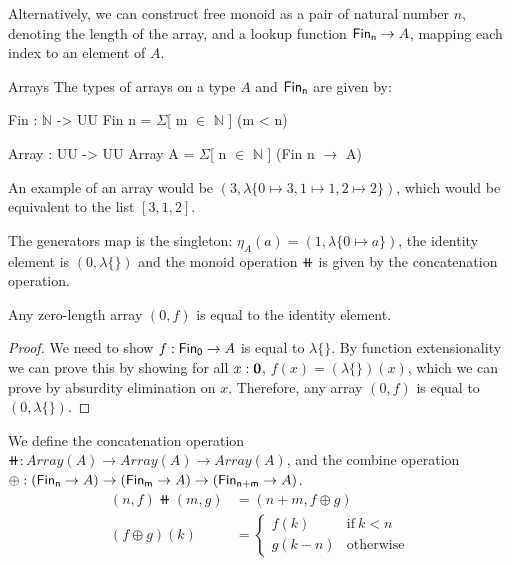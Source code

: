 Alternatively, we can construct free monoid as a pair of natural number $n$, denoting the length of the array,
and a lookup function $\Fin[n] \to A$, mapping each index to an element of $A$.

\begin{definition}{Arrays}
The types of arrays on a type $A$ and $\Fin[n]$ are given by:
\vspace{1em}
\begin{code}
Fin : $\mathbb{N}$ -> UU
Fin n = $\Sigma$[ m $\in$ $\mathbb{N}$ ] (m < n)

Array : UU -> UU
Array A = $\Sigma$[ n $\in$ $\mathbb{N}$ ] (Fin n $\to$ A)
\end{code}
\vspace{1em}
\end{definition}

An example of an array would be $(3, \lambda\{ 0 \mapsto 3, 1 \mapsto 1, 2 \mapsto 2 \})$, which would
be equivalent to the list $[3, 1, 2]$.

The generators map is the singleton: $\eta_A(a) = (1, \lambda\{ 0 \mapsto a \})$, 
the identity element is $(0, \lambda\{\})$
and the monoid operation $\doubleplus$ is given by the concatenation operation.

\begin{lemma}\label{array:zero-is-id}
Any zero-length array $(0, f)$ is equal to the identity element.
\end{lemma}

\begin{proof}
We need to show $f : \Fin[0] \to A$ is equal to $\lambda\{\}$. By function extensionality we can prove
this by showing for all $x : {\mathbf{0}}$, $f(x) = (\lambda\{\})(x)$, which we can prove by absurdity elimination on $x$.
Therefore, any array $(0, f)$ is equal to $(0, \lambda\{\})$.
\end{proof}

\begin{definition}[Concatenation]
We define the concatenation operation $\doubleplus : Array(A) \to Array(A) \to Array(A)$,
and the combine operation $\oplus : (\Fin[n] \to A) \to (\Fin[m] \to A) \to (\Fin[n+m] \to\nolinebreak A)$.
\begin{align*}
    (n , f) \doubleplus (m , g) & = (n + m , f \oplus g) \\
    (f \oplus g)(k) & = \begin{cases}
      f(k) & \text{if}\ k < n \\
      g(k - n) & \text{otherwise}
    \end{cases}
\end{align*} 
\end{definition}

